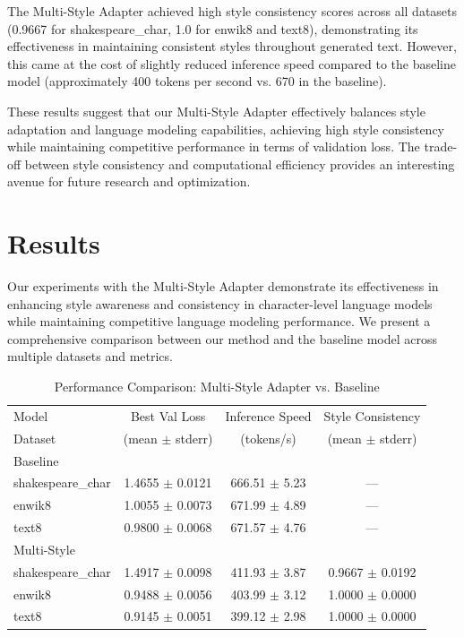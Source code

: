 \documentclass{article} %
\begin{document}
The Multi-Style Adapter achieved high style consistency scores across all datasets (0.9667 for shakespeare\_char, 1.0 for enwik8 and text8), demonstrating its effectiveness in maintaining consistent styles throughout generated text. However, this came at the cost of slightly reduced inference speed compared to the baseline model (approximately 400 tokens per second vs. 670 in the baseline).

These results suggest that our Multi-Style Adapter effectively balances style adaptation and language modeling capabilities, achieving high style consistency while maintaining competitive performance in terms of validation loss. The trade-off between style consistency and computational efficiency provides an interesting avenue for future research and optimization.

\section{Results}
\label{sec:results}

Our experiments with the Multi-Style Adapter demonstrate its effectiveness in enhancing style awareness and consistency in character-level language models while maintaining competitive language modeling performance. We present a comprehensive comparison between our method and the baseline model across multiple datasets and metrics.

\begin{table}[h]
\centering
\caption{Performance Comparison: Multi-Style Adapter vs. Baseline}
\label{tab:performance_comparison}
\begin{tabular}{lccc}
\toprule
Model & Best Val Loss & Inference Speed & Style Consistency \\
Dataset & (mean $\pm$ stderr) & (tokens/s) & (mean $\pm$ stderr) \\
\midrule
Baseline & & & \\
shakespeare\_char & 1.4655 $\pm$ 0.0121 & 666.51 $\pm$ 5.23 & --- \\
enwik8 & 1.0055 $\pm$ 0.0073 & 671.99 $\pm$ 4.89 & --- \\
text8 & 0.9800 $\pm$ 0.0068 & 671.57 $\pm$ 4.76 & --- \\
\midrule
Multi-Style & & & \\
shakespeare\_char & 1.4917 $\pm$ 0.0098 & 411.93 $\pm$ 3.87 & 0.9667 $\pm$ 0.0192 \\
enwik8 & 0.9488 $\pm$ 0.0056 & 403.99 $\pm$ 3.12 & 1.0000 $\pm$ 0.0000 \\
text8 & 0.9145 $\pm$ 0.0051 & 399.12 $\pm$ 2.98 & 1.0000 $\pm$ 0.0000 \\
\bottomrule
\end{tabular}
\end{table}
\end{document}
